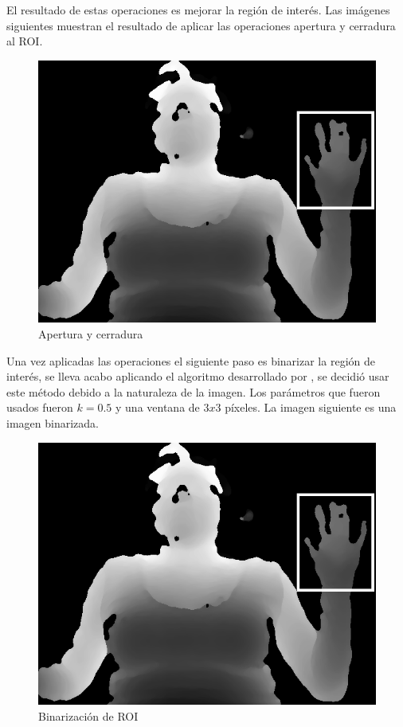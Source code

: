 El resultado de estas operaciones es mejorar la región de interés. Las imágenes siguientes muestran el resultado de aplicar las operaciones apertura y cerradura al ROI. 

\begin{figure}[!h]
\begin{center}
\includegraphics[scale=.5]{./Figures/roi.png}
\end{center}
\caption{Apertura y cerradura}
\label{fig:ImagenOpenClose}
\end{figure}  

Una vez aplicadas las operaciones el siguiente paso es binarizar la región de interés, se lleva acabo aplicando el algoritmo desarrollado por \citep{Niblack1985}, se decidió usar este método debido a la naturaleza de la imagen. Los parámetros que fueron usados fueron $k=0.5$ y una ventana de $3x3$ p\'ixeles. La imagen siguiente es una imagen binarizada. 

\begin{figure}[!h]
\begin{center}
\includegraphics[scale=.5]{./Figures/roi.png}
\end{center}
\caption{Binarización de ROI}
\label{fig:BinarizationRoi}
\end{figure}
 
